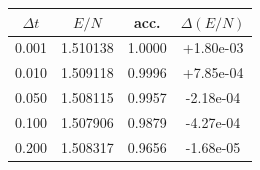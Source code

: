 \begin{center}
\label{tab:1c-alpha045}
\setlength{\tabcolsep}{2.2pt}
\begin{tabular}{@{}cccc@{}}
\toprule
$\Delta t$ & $E/N$ & acc. & $\Delta(E/N)$ \\
\midrule
0.001 & 1.510138 & 1.0000 & +1.80e-03 \\
0.010 & 1.509118 & 0.9996 & +7.85e-04 \\
0.050 & 1.508115 & 0.9957 & -2.18e-04 \\
0.100 & 1.507906 & 0.9879 & -4.27e-04 \\
0.200 & 1.508317 & 0.9656 & -1.68e-05 \\
\bottomrule
\end{tabular}
\end{center}

